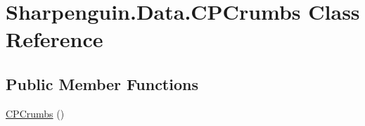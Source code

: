 \hypertarget{classSharpenguin_1_1Data_1_1CPCrumbs}{\section{\-Sharpenguin.\-Data.\-C\-P\-Crumbs \-Class \-Reference}
\label{classSharpenguin_1_1Data_1_1CPCrumbs}
}
\subsection*{\-Public \-Member \-Functions}
\begin{DoxyCompactItemize}
\item 
\hyperlink{classSharpenguin_1_1Data_1_1CPCrumbs_aee8823e5bc4e647ba69af9c488e9b16d}{\-C\-P\-Crumbs} ()
\end{DoxyCompactItemize}
